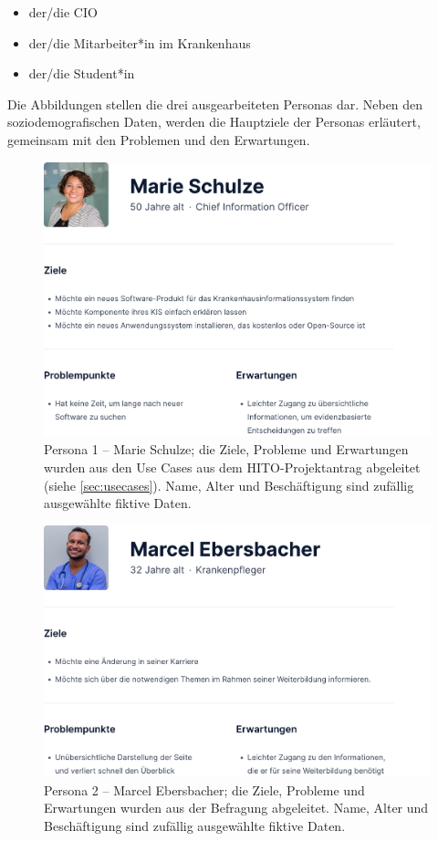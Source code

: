 \begin{itemize}
\item der/die \ac{CIO}
\item der/die Mitarbeiter*in im Krankenhaus
\item der/die Student*in
\end{itemize}

Die Abbildungen  stellen die drei ausgearbeiteten Personas dar.
Neben den soziodemografischen Daten, werden die Hauptziele der Personas erläutert, gemeinsam mit den Problemen und den Erwartungen.

\begin{figure}[H]
	\centering
    	\includegraphics[width=1.1\textwidth]{Images/Persona_1}
   	\caption[Persona 1]{Persona 1 -- Marie Schulze; die Ziele, Probleme und Erwartungen wurden aus den Use Cases aus dem HITO-Projektantrag abgeleitet (siehe \ref{sec:usecases}). Name, Alter und Beschäftigung sind zufällig ausgewählte fiktive Daten.}
   	\label{fig:persona1}
\end{figure}

\begin{figure}[H]
	\centering
    	\includegraphics[width=1.1\textwidth]{Images/Persona_2}
   	\caption[Persona 2]{Persona 2 -- Marcel Ebersbacher; die Ziele, Probleme und Erwartungen wurden aus der Befragung abgeleitet. Name, Alter und Beschäftigung sind zufällig ausgewählte fiktive Daten.}
   	\label{fig:persona2}
\end{figure}

